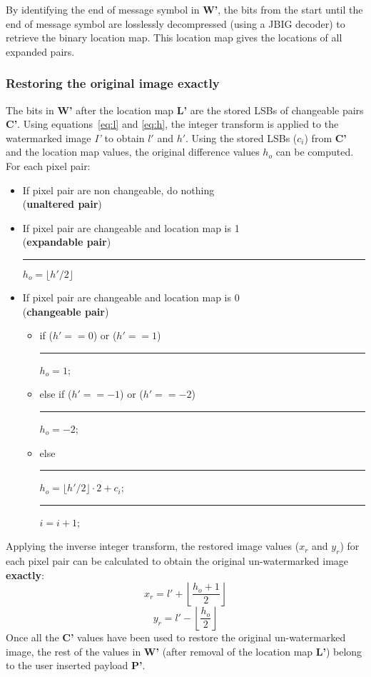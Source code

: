 \documentclass[10pt,twocolumn,letterpaper]{article}
\begin{document}
{By identifying the end of message symbol in {\bf W'}, the 
bits from the start until the end of message symbol are losslessly decompressed
(using a JBIG decoder) to retrieve the binary location map.
This location map gives the locations of all expanded pairs.

\subsubsection{Restoring the original image exactly}
\label{sec:restore}
The bits in {\bf W'} after the location map {\bf L'} are the stored LSBs of changeable pairs {\bf C'}. 
Using equations~\ref{eq:l} and \ref{eq:h}, the integer transform is applied to the watermarked image \emph{I'} to obtain
$l'$ and $h'$. Using the stored LSBs ($c_{i}$) from {\bf C'}
and the location map values, the original difference values $h_{o}$ can be computed. For each pixel pair:
\begin{itemize}
	\item If pixel pair are non changeable, do nothing \\ ({\bf unaltered pair})
	\item If pixel pair are changeable and location map is 1 \\ ({\bf expandable pair}) \\ \rule{0.2cm}{0cm} $h_{o} = \lfloor h'/2 \rfloor$
	\item If pixel pair are changeable and location map is 0 \\ ({\bf changeable pair}) 
	\begin{itemize}
		\item if ($h'==0$) or ($h'==1$) \\ \rule{0.2cm}{0cm} $h_{o}=1$;
		\item else if ($h'==-1$) or ($h'==-2$) \\ \rule{0.2cm}{0cm} $h_{o}=-2$;
		\item else \\ \rule{0.2cm}{0cm} $h_{o}= \lfloor h'/2 \rfloor \cdot 2 + c_{i}$; \\ \rule{0.2cm}{0cm} $i=i+1$;
	\end{itemize}
\end{itemize}
Applying the inverse integer transform, the restored image values ($x_{r}$ and $y_{r}$) 
for each pixel pair can be calculated
to obtain the original un-watermarked image {\bf exactly}:
\begin{equation}
x_{r} = l' + \left \lfloor \frac{h_{o}+1}{2} \right \rfloor 
\end{equation}
\begin{equation}
y_{r} = l' - \left \lfloor \frac{h_{o}}{2} \right \rfloor 
\end{equation}
Once all the {\bf C'} values have been used to restore the original un-watermarked image, the rest of the values in {\bf W'}
(after removal of the location map {\bf L'}) belong to the user inserted payload {\bf P'}.

}
\end{document}
